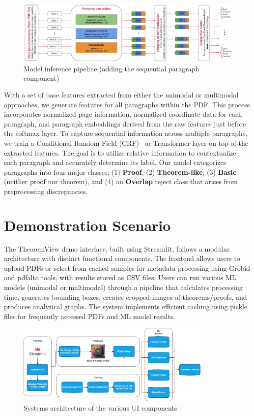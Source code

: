\documentclass[runningheads]{llncs}
\begin{document}
\begin{figure}
	\centering
	\includegraphics[width=\textwidth]{images/general_pipeline.pdf}
	\caption{Model inference pipeline (adding the sequential paragraph component)}
	\label{fig:generalpipeline}
\end{figure}


With a set of base features extracted from either the unimodal or multimodal approaches, we generate
features for all paragraphs within the PDF. This process incorporates normalized page information,
normalized coordinate data for each paragraph, and paragraph embeddings derived from the raw features
just before the softmax layer. To capture sequential information across multiple paragraphs, we train a
Conditional Random Field (CRF)~\cite{CRF2001Lafferty} or Transformer layer on top of the extracted features. The goal is to utilize
relative information to contextualize each paragraph and accurately determine its label. Our model
categorizes paragraphs into four major classes: (1) \textbf{Proof}, (2) \textbf{Theorem-like}, (3) \textbf{Basic} (neither
proof nor theorem), and (4) an \textbf{Overlap} reject class that arises from preprocessing discrepancies.

\section{Demonstration Scenario}

The TheoremView demo interface, built using Streamlit, follows a modular architecture with distinct functional components. The frontend allows users to upload PDFs or select from cached samples for metadata processing using Grobid and pdfalto tools, with results stored as CSV files. Users can run various ML models (unimodal or multimodal) through a pipeline that calculates processing time, generates bounding boxes, creates cropped images of theorems/proofs, and produces analytical graphs. The system implements efficient caching using pickle files for frequently accessed PDFs and ML model results.

\begin{figure}
	\centering
	\includegraphics[width=0.85\textwidth]{images/sys-demo-arch.png}
	\caption{Systems architecture of the various UI components
	}
	\label{fig:system-arch}
\end{figure}
\end{document}
